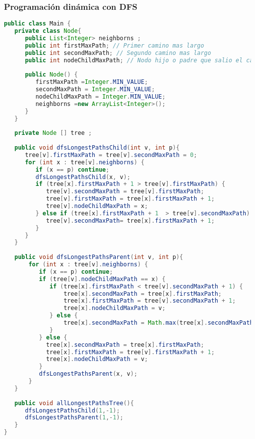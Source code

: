 \subsubsection{Programación dinámica con DFS}
\begin{lstlisting}[language=Java]
public class Main {
   private class Node{
      public List<Integer> neighborns ;
      public int firstMaxPath; // Primer camino mas largo
      public int secondMaxPath; // Segundo camino mas largo
	  public int nodeChildMaxPath; // Nodo hijo o padre que salio el camino mas largo
		
      public Node() {
         firstMaxPath =Integer.MIN_VALUE;
         secondMaxPath = Integer.MIN_VALUE;
         nodeChildMaxPath = Integer.MIN_VALUE;
         neighborns =new ArrayList<Integer>();
      }
   }
   
   private Node [] tree ;
   
   public void dfsLongestPathsChild(int v, int p){
      tree[v].firstMaxPath = tree[v].secondMaxPath = 0;
      for (int x : tree[v].neighborns) {
         if (x == p) continue;
         dfsLongestPathsChild(x, v);
         if (tree[x].firstMaxPath + 1 > tree[v].firstMaxPath) {
            tree[v].secondMaxPath = tree[v].firstMaxPath;
            tree[v].firstMaxPath = tree[x].firstMaxPath + 1;
            tree[v].nodeChildMaxPath = x;
         } else if (tree[x].firstMaxPath + 1  > tree[v].secondMaxPath) {
            tree[v].secondMaxPath= tree[x].firstMaxPath + 1;
         }
      }
   }
	
   public void dfsLongestPathsParent(int v, int p){
       for (int x : tree[v].neighborns) {
          if (x == p) continue;
          if (tree[v].nodeChildMaxPath == x) {
             if (tree[x].firstMaxPath < tree[v].secondMaxPath + 1) {
                 tree[x].secondMaxPath = tree[x].firstMaxPath;
                 tree[x].firstMaxPath = tree[v].secondMaxPath + 1;
                 tree[x].nodeChildMaxPath = v;
             } else {
                 tree[x].secondMaxPath = Math.max(tree[x].secondMaxPath,tree[v].secondMaxPath + 1);
             }
          } else {
            tree[x].secondMaxPath = tree[x].firstMaxPath;
			tree[x].firstMaxPath = tree[v].firstMaxPath + 1;
			tree[x].nodeChildMaxPath = v;
		  }
		  dfsLongestPathsParent(x, v);
       }
   }
	
   public void allLongestPathsTree(){
      dfsLongestPathsChild(1,-1);
      dfsLongestPathsParent(1,-1);
   }
}
\end{lstlisting}

